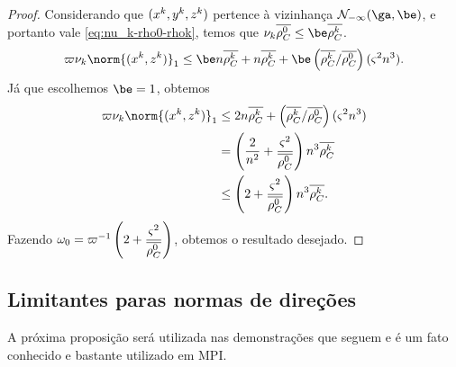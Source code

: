 \begin{proof}
Considerando que $(x^{k},y^{k},z^{k})$ pertence à vizinhança $\Nset_{-\infty}(\ga,\be)$, e portanto vale  \eqref{eq:nu_k-rho0-rhok}, temos que $\nu_k \dbvec{\rho_C^0} \leq \be \dbvec{\rho_C^{k}}$. 
\[
	\bdxzzero\nu_k\norm{(\xk,\zk)}_{1}   \leq \be n\dbvec{\rho_C^{k}}+ n\dbvec{\rho_C^{k}} + \be\left(\dbvec{\rho_C^{k}}/\dbvec{\rho_C^{0}}\right)(\bdxzstar^{2} n^3  ). 
\]Já que escolhemos $\be=1$, obtemos 
\begin{align*}
	\bdxzzero\nu_k\norm{(\xk,\zk)}_{1}  & \leq 2 n\dbvec{\rho_C^{k}}+ \left(\dbvec{\rho_C^{k}}/\dbvec{\rho_C^{0}}\right)(\bdxzstar^{2} n^3  ) \\	
								 &= \left(\frac{2}{n^{2}}  + \frac{\bdxzstar^{2}}{\dbvec{\rho_C^{0}}}\right)  n^{3}\dbvec{\rho_C^{k}} \\
								 &  \leq \left(2  + \frac{\bdxzstar^{2}}{\dbvec{\rho_C^{0}}}\right)  n^{3}\dbvec{\rho_C^{k}}.								
\end{align*}
Fazendo $\omega_{0} = \varpi^{-1}\left(2  + \dfrac{\varsigma^{2}}{\overline{\rho_C^{0}}}\right)$, obtemos o resultado desejado.
\end{proof}




\subsection{Limitantes paras normas de direções} 

A próxima proposição será utilizada nas demonstrações que seguem e é um fato conhecido e bastante utilizado em \ac{MPI}.

